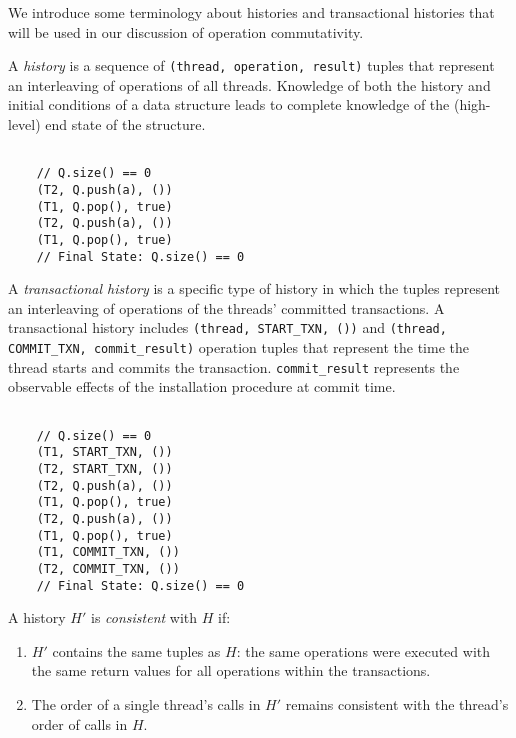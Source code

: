 We introduce some terminology about histories and transactional histories that will be used in our discussion of operation commutativity.

\begin{defn}
    A \emph{history} is a sequence of \texttt{(thread, operation, result)} tuples that represent an interleaving of operations of all threads. Knowledge of both the history and initial conditions of a data structure leads to complete knowledge of the (high-level) end state of the structure.
\end{defn}

\begin{eg}
    \singlespacing   

    \begin{lstlisting}

    // Q.size() == 0 
    (T2, Q.push(a), ())
    (T1, Q.pop(), true)
    (T2, Q.push(a), ())
    (T1, Q.pop(), true)
    // Final State: Q.size() == 0 
    \end{lstlisting}
    \doublespacing
\end{eg}
\begin{defn}
    A \emph{transactional history} is a specific type of history in which the tuples represent an interleaving of operations of the threads' committed transactions. A transactional history includes \texttt{(thread, START\_TXN, ())} and \texttt{(thread, COMMIT\_TXN, commit\_result)} operation tuples that represent the time the thread starts and commits the transaction. \texttt{commit\_result} represents the observable effects of the installation procedure at commit time.

\begin{eg}
    \singlespacing   

    \begin{lstlisting}

    // Q.size() == 0 
    (T1, START_TXN, ())
    (T2, START_TXN, ())
    (T2, Q.push(a), ())
    (T1, Q.pop(), true)
    (T2, Q.push(a), ())
    (T1, Q.pop(), true)
    (T1, COMMIT_TXN, ())
    (T2, COMMIT_TXN, ())
    // Final State: Q.size() == 0 
    \end{lstlisting}
    \doublespacing
\end{eg}

\end{defn}

\begin{defn}
    A history $H'$ is \emph{consistent} with $H$ if:
    \begin{enumerate}
        \item $H'$ contains the same tuples as $H$: the same operations were executed with the same return values for all operations within the transactions.
        \item The order of a single thread's calls in $H'$ remains consistent with the thread's order of calls in $H$.
    \end{enumerate}
\end{defn}

